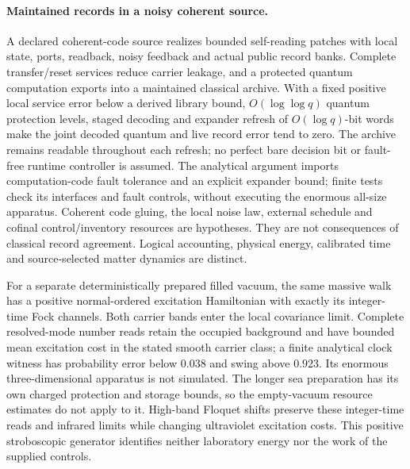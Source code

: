\paragraph{Maintained records in a noisy coherent source.}
A declared coherent-code source realizes bounded self-reading patches with
local state, ports, readback, noisy feedback and actual public record banks.
Complete transfer/reset services reduce carrier leakage, and a protected
quantum computation exports into a maintained classical archive. With a
fixed positive local service error below a derived library bound,
$O(\log\log q)$ quantum protection levels, staged decoding and expander
refresh of $O(\log q)$-bit words make the joint decoded quantum and live
record error tend to zero. The archive remains readable throughout each
refresh; no perfect bare decision bit or fault-free runtime controller is
assumed. The analytical argument imports computation-code fault tolerance
and an explicit expander bound; finite tests check its interfaces and fault
controls, without executing the enormous all-size apparatus.
Coherent code gluing, the local noise law, external schedule and cofinal
control/inventory resources are hypotheses. They are not consequences of
classical record agreement. Logical accounting, physical energy, calibrated
time and source-selected matter dynamics are distinct.

For a separate deterministically prepared filled vacuum, the same massive
walk has a positive normal-ordered excitation Hamiltonian with exactly its
integer-time Fock channels. Both carrier bands enter the local covariance
limit. Complete resolved-mode number reads retain the occupied background
and have bounded mean excitation cost in the stated smooth carrier class; a finite
analytical clock witness has probability error below $0.038$ and swing above
$0.923$. Its enormous three-dimensional apparatus is not simulated.
The longer sea preparation has its own charged protection and storage bounds,
so the empty-vacuum resource estimates do not apply to it. High-band Floquet
shifts preserve these integer-time reads and infrared limits while changing
ultraviolet excitation costs. This positive stroboscopic generator identifies
neither laboratory energy nor the work of the supplied controls.
